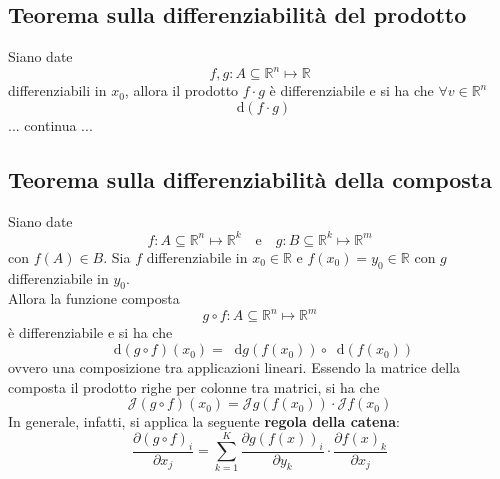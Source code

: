 \documentclass[a4paper]{extarticle}
\newcommand*\dif{\mathop{}\!\mathrm{d}}
\begin{document}
\vspace{1em}
\noindent
\subsection{Teorema sulla differenziabilità del prodotto}
Siano date
\[f,g : A \subseteq \mathbb{R}^n \longmapsto \mathbb{R}\]
differenziabili in $x_0$, allora il prodotto $f \cdot g$ è differenziabile e si ha che $\forall v \in \mathbb{R}^n$
\[\dif (f \cdot g)\]
... continua ...

\vspace{1em}
\noindent
\subsection{Teorema sulla differenziabilità della composta}
Siano date
\[f : A \subseteq \mathbb{R}^n \longmapsto \mathbb{R}^k \hspace{1em} \text{e} \hspace{1em} g : B \subseteq \mathbb{R}^k \longmapsto \mathbb{R}^m\]
con $f(A) \in B$. Sia $f$ differenziabile in $x_0 \in \mathbb{R}$ e $f(x_0)=y_0 \in \mathbb{R}$ con $g$ differenziabile in $y_0$.\\
Allora la funzione composta
\[g \circ f : A \subseteq \mathbb{R}^n \longmapsto \mathbb{R}^m\]
è differenziabile e si ha che
\[\dif(g \circ f)(x_0) = \dif g(f(x_0)) \circ \dif(f(x_0))\]
ovvero una composizione tra applicazioni lineari. Essendo la matrice della composta il prodotto righe per colonne tra matrici, si ha che
\[\mathcal{J}(g \circ f)(x_0) = \mathcal{J}g(f(x_0)) \cdot \mathcal{J}f(x_0)\]
In generale, infatti, si applica la seguente \textbf{regola della catena}:
\[\frac{\partial (g \circ f)_i}{\partial x_j} = \sum_{k=1}^K \frac{\partial g(f(x))_i}{\partial y_k} \cdot \frac{\partial f(x)_k}{\partial x_j}\]
\end{document}
